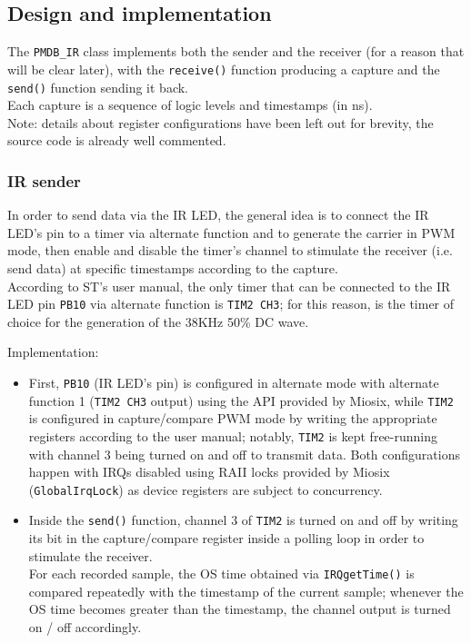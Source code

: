 \documentclass[10pt,a4]{article}
\begin{document}
\subsection{Design and implementation}
The \texttt{PMDB\_IR} class implements both the sender and the receiver (for a reason that will be clear later), with the \texttt{receive()} function producing a capture and the \texttt{send()} function sending it back.\\
Each capture is a sequence of logic levels and timestamps (in ns).\\
Note: details about register configurations have been left out for brevity, the source code is already well commented.
\subsubsection{IR sender}
In order to send data via the IR LED, the general idea is to connect the IR LED's pin to a timer via alternate function and to generate the carrier in PWM mode, then enable and disable the timer's channel to stimulate the receiver (i.e. send data) at specific timestamps according to the capture.\\
According to ST's user manual, the only timer that can be connected to the IR LED pin \texttt{PB10} via alternate function is \texttt{TIM2 CH3}; for this reason,  is the timer of choice for the generation of the 38KHz 50\% DC wave.

Implementation:
\begin{itemize}
\item First, \texttt{PB10} (IR LED's pin) is configured in alternate mode with alternate function 1 (\texttt{TIM2 CH3} output) using the API provided by Miosix, while \texttt{TIM2} is configured in capture/compare PWM mode by writing the appropriate registers according to the user manual; notably, \texttt{TIM2} is kept free-running with channel 3 being turned on and off to transmit data. Both configurations happen with IRQs disabled using RAII locks provided by Miosix (\texttt{GlobalIrqLock}) as device registers are subject to concurrency.

\item Inside the \texttt{send()} function, channel 3 of \texttt{TIM2} is turned on and off by writing its bit in the capture/compare register inside a polling loop in order to stimulate the receiver.\\
For each recorded sample, the OS time obtained via \texttt{IRQgetTime()} is compared repeatedly with the timestamp of the current sample; whenever the OS time becomes greater than the timestamp, the channel output is turned on / off accordingly.
\end{itemize}
\end{document}
